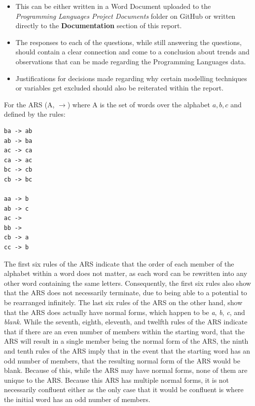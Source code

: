 \documentclass{article}
\theoremstyle{theorem}
\theoremstyle{definition}
\theoremstyle{remark}
\begin{document}
\begin{enumerate}
    \begin{itemize}
        \item This can be either written in a Word Document uploaded to the \textit{Programming Languages Project Documents} folder on GitHub or written directly to the \textbf{Documentation} section of this report.
        \item The responses to each of the questions, while still answering the questions, should contain a clear connection and come to a conclusion about trends and observations that can be made regarding the Programming Languages data.
        \item Justifications for decisions made regarding why certain modelling techniques or variables get excluded should also be reiterated within the report.
    \end{itemize}
\end{enumerate}
For the ARS (A, $\xrightarrow{}$) where A is the set of words over the alphabet ${a, b, c}$ and defined by the rules:
\begin{lstlisting}
ba -> ab
ab -> ba
ac -> ca
ca -> ac
bc -> cb
cb -> bc

aa -> b
ab -> c
ac ->
bb ->
cb -> a
cc -> b
\end{lstlisting}
The first six rules of the ARS indicate that the order of each member of the alphabet within a word does not matter, as each word can be rewritten into any other word containing the same letters. Consequently, the first six rules also show that the ARS does not necessarily terminate, due to being able to a potential to be rearranged infinitely. The last six rules of the ARS on the other hand, show that the ARS does actually have normal forms, which happen to be \textit{a}, \textit{b}, \textit{c}, and \textit{blank}. While the seventh, eighth, eleventh, and twelfth rules of the ARS indicate that if there are an even number of members within the starting word, that the ARS will result in a single member being the normal form of the ARS, the ninth and tenth rules of the ARS imply that in the event that the starting word has an odd number of members, that the resulting normal form of the ARS would be blank. Because of this, while the ARS may have normal forms, none of them are unique to the ARS. Because this ARS has multiple normal forms, it is not necessarily confluent either as the only case that it would be confluent is where the initial word has an odd number of members.
\end{document}
